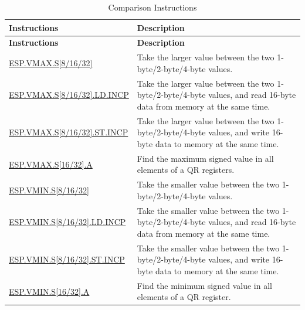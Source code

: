 
\begin{longtable}[c]{|l|m{11cm}|}
    \caption{Comparison Instructions}
    \label{tab:pie-comparison-instructions}\\
    \hline
    \rowcolor{lightgray}
    \textbf{Instructions} & \textbf{Description} \\\hline
    \endfirsthead
    \rowcolor{lightgray}
    \textbf{Instructions} & \textbf{Description} \\\hline
    \endhead
    \endfoot

    \hyperref[instruction:ESPVMAXS8]{ESP.VMAX.S[8/16/32]} & Take the larger value between the two 1-byte/2-byte/4-byte values.
    \\\hline
    \hyperref[instruction:ESPVMAXS8LDINCP]{ESP.VMAX.S[8/16/32].LD.INCP} & Take the larger value between the two 1-byte/2-byte/4-byte values, and read 16-byte data from memory at the same time.
    \\\hline
    \hyperref[instruction:ESPVMAXS8STINCP]{ESP.VMAX.S[8/16/32].ST.INCP} & Take the larger value between the two 1-byte/2-byte/4-byte values, and write 16-byte data to memory at the same time.
    \\\hline
        \hyperref[instruction:ESPMAXS16A]{ESP.VMAX.S[16/32].A} & Find the maximum signed value in all elements of a QR registers.
    \\\hline
    \hyperref[instruction:ESPVMINS8]{ESP.VMIN.S[8/16/32]} & Take the smaller value between the two 1-byte/2-byte/4-byte values.
    \\\hline
    \hyperref[instruction:ESPVMINS8LDINCP]{ESP.VMIN.S[8/16/32].LD.INCP} & Take the smaller value between the two 1-byte/2-byte/4-byte values, and read 16-byte data from memory at the same time.
    \\\hline
    \hyperref[instruction:ESPVMINS8STINCP]{ESP.VMIN.S[8/16/32].ST.INCP} & Take the smaller value between the two 1-byte/2-byte/4-byte values, and write 16-byte data to memory at the same time.
    \\\hline
    \hyperref[instruction:ESPMINS16A]{ESP.VMIN.S[16/32].A} & Find the minimum signed value in all elements of a QR register.
    \\\hline


\end{longtable}

